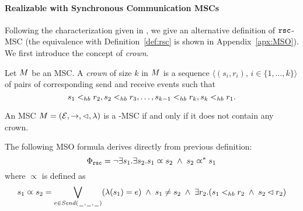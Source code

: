 \paragraph{\bf Realizable with Synchronous Communication MSCs} 

Following the characterization given in \cite[Theorem 4.4]{DBLP:journals/dc/Charron-BostMT96}, we  give an alternative definition of $\mathtt{rsc}$-MSC (the equivalence with Definition~\ref{def:rsc} is shown in Appendix~\ref{apx:MSO}). We first  introduce the concept of \emph{crown}.

\begin{definition} [crown]
	Let $M$ be an MSC. A \emph{crown} of size $k$ in $M$ is a sequence $\langle(s_i,r_i),\, i \in \{1,\dots,k\}\rangle$ of pairs of corresponding send and receive events such that
	\[
		s_1 <_{hb} r_2, s_2 <_{hb} r_3, \dots, s_{k-1} <_{hb} r_k, s_k <_{hb} r_1.
	\]
\end{definition}

\begin{definition} \label{def:rsc_alt}
	An MSC $M = (\mathcal{E},\to,\lhd,\lambda)$ is a \rsc-MSC if and only if it does not contain any crown.
\end{definition}


The following MSO formula derives directly from previous  definition:
\[\Phi_{\mathtt{rsc}} = \neg \exists s_1.\exists s_2. s_1 \varpropto s_2 \;\wedge\; s_2 \varpropto^\ast s_1
\]
\noindent where $\varpropto$ is defined as
\[
s_1 \varpropto s_2 =
\bigvee_{\substack{e \in {\mathit{Send}(\hspace{0.1em}\underline{\hspace{0.5em}}\hspace{0.1em},\hspace{0.1em}\underline{\hspace{0.5em}}\hspace{0.1em},\hspace{0.1em}\underline{\hspace{0.5em}}\hspace{0.1em})}}}(\lambda(s_1) = e) \;\wedge\;
s_1 \neq s_2 \;\wedge\;
\exists r_2. (s_1 <_{hb} r_2 \;\wedge\; s_2 \lhd r_2)
\]



